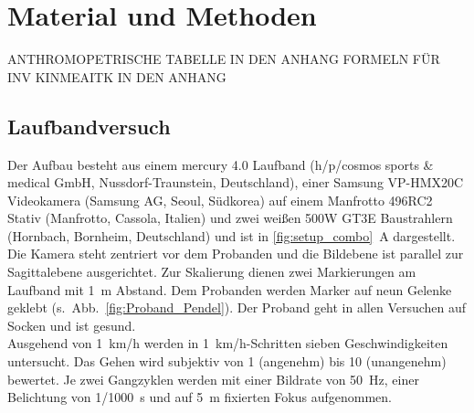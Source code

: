 \section{Material und Methoden} 
ANTHROMOPETRISCHE TABELLE IN DEN ANHANG
FORMELN FÜR INV KINMEAITK IN DEN ANHANG
\subsection{Laufbandversuch}
Der Aufbau besteht aus einem mercury 4.0 Laufband (h/p/cosmos sports \& medical GmbH, Nussdorf-Traunstein, Deutschland), einer Samsung VP-HMX20C Videokamera (Samsung AG, Seoul, Südkorea) auf einem Manfrotto 496RC2 Stativ (Manfrotto, Cassola, Italien) und zwei weißen 500W GT3E Baustrahlern (Hornbach, Bornheim, Deutschland) und ist in \autoref{fig:setup_combo}~A dargestellt. Die Kamera steht zentriert vor dem Probanden und die Bildebene ist parallel zur Sagittalebene ausgerichtet. Zur Skalierung dienen zwei Markierungen am Laufband mit 1~m Abstand. Dem Probanden werden Marker auf neun Gelenke geklebt (s.~Abb.~\ref{fig:Proband_Pendel}). Der Proband geht in allen Versuchen auf Socken und ist gesund.\\
Ausgehend von 1~km/h werden in 1~km/h-Schritten sieben Geschwindigkeiten untersucht. Das Gehen wird subjektiv von 1 (angenehm) bis 10 (unangenehm) bewertet. Je zwei Gangzyklen werden mit einer Bildrate von 50~Hz, einer Belichtung von 1/1000~s und auf 5~m fixierten Fokus aufgenommen.\\

